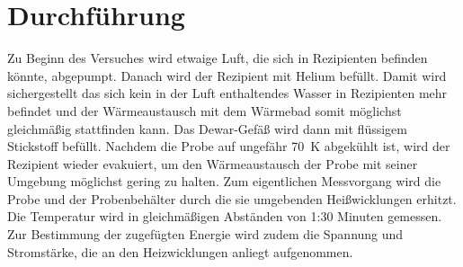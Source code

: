 \section{Durchführung}

Zu Beginn des Versuches wird etwaige Luft, die sich in Rezipienten befinden könnte, abgepumpt. Danach wird der Rezipient mit Helium befüllt. Damit wird sichergestellt das sich kein in der Luft enthaltendes Wasser in Rezipienten mehr befindet und der Wärmeaustausch mit dem Wärmebad somit möglichst gleichmäßig stattfinden kann. Das Dewar-Gefäß wird dann mit flüssigem Stickstoff befüllt. Nachdem die Probe auf ungefähr \SI{70}{\K} abgekühlt ist, wird der Rezipient wieder evakuiert, um den Wärmeaustausch der Probe mit seiner Umgebung möglichst gering zu halten.
Zum eigentlichen Messvorgang wird die Probe und der Probenbehälter durch die sie umgebenden Heißwicklungen erhitzt. Die Temperatur wird in gleichmäßigen Abständen von 1:30 Minuten gemessen. Zur Bestimmung der zugefügten Energie wird zudem die Spannung und Stromstärke, die an den Heizwicklungen anliegt aufgenommen. 